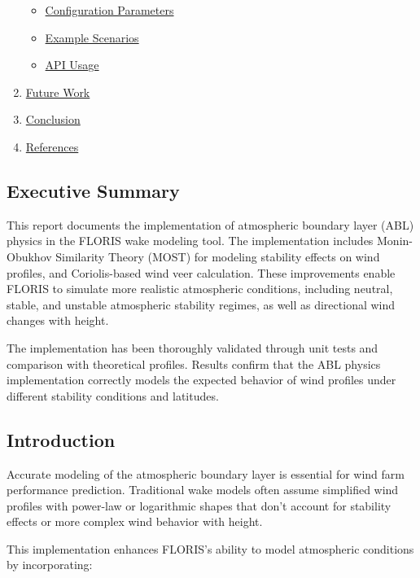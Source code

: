 \documentclass{article}
\begin{document}
\begin{enumerate}[label=\arabic*.]
  \begin{itemize}[label=\textbullet]
  \item
    \protect\hyperlink{configuration-parameters}{Configuration
    Parameters}
  \item
    \protect\hyperlink{example-scenarios}{Example Scenarios}
  \item
    \protect\hyperlink{api-usage}{API Usage}
  \end{itemize}
\item
  \protect\hyperlink{future-work}{Future Work}
\item
  \protect\hyperlink{conclusion}{Conclusion}
\item
  \protect\hyperlink{references}{References}
\end{enumerate}

\hypertarget{executive-summary}{%
\subsection{Executive Summary}\label{executive-summary}}

This report documents the implementation of atmospheric boundary layer
(ABL) physics in the FLORIS wake modeling tool. The implementation
includes Monin-Obukhov Similarity Theory (MOST) for modeling stability
effects on wind profiles, and Coriolis-based wind veer calculation.
These improvements enable FLORIS to simulate more realistic atmospheric
conditions, including neutral, stable, and unstable atmospheric
stability regimes, as well as directional wind changes with height.

The implementation has been thoroughly validated through unit tests and
comparison with theoretical profiles. Results confirm that the ABL
physics implementation correctly models the expected behavior of wind
profiles under different stability conditions and latitudes.

\hypertarget{introduction}{%
\subsection{Introduction}\label{introduction}}

Accurate modeling of the atmospheric boundary layer is essential for
wind farm performance prediction. Traditional wake models often assume
simplified wind profiles with power-law or logarithmic shapes that don't
account for stability effects or more complex wind behavior with height.

This implementation enhances FLORIS's ability to model atmospheric
conditions by incorporating:
\end{document}

